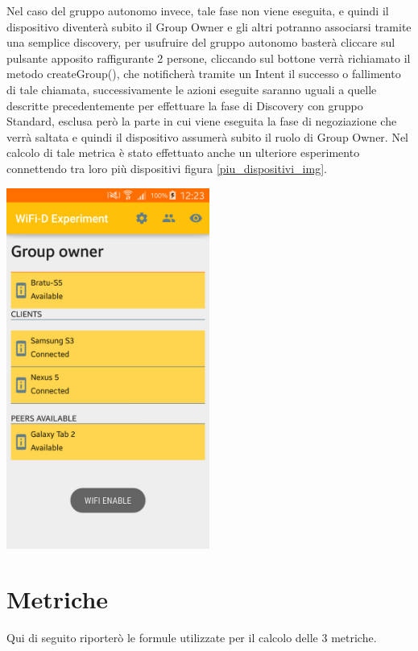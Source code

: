 Nel caso del gruppo autonomo invece, tale fase non viene eseguita, e quindi il dispositivo diventerà subito il Group Owner e gli altri potranno associarsi tramite una semplice discovery, per usufruire del gruppo autonomo basterà cliccare sul pulsante apposito raffigurante 2 persone, cliccando sul bottone verrà richiamato il metodo createGroup(), che notificherà tramite un Intent il successo o fallimento di tale chiamata, successivamente le azioni eseguite saranno uguali a quelle descritte precedentemente per effettuare la fase di Discovery con gruppo Standard, esclusa però la parte in cui viene eseguita la fase di negoziazione che verrà saltata e quindi il dispositivo assumerà subito il ruolo di Group Owner.
Nel calcolo di tale metrica è stato effettuato anche un ulteriore esperimento connettendo tra loro più dispositivi figura \ref{piu_dispositivi_img}.

\begin{center}
\includegraphics[width=0.5\textwidth]{imgs/piu_dispositivi.png}
\label{piu_dispositivi_img}%
\end{center}
\newpage


\section{Metriche}
Qui di seguito riporterò le formule utilizzate per il calcolo delle 3 metriche.

